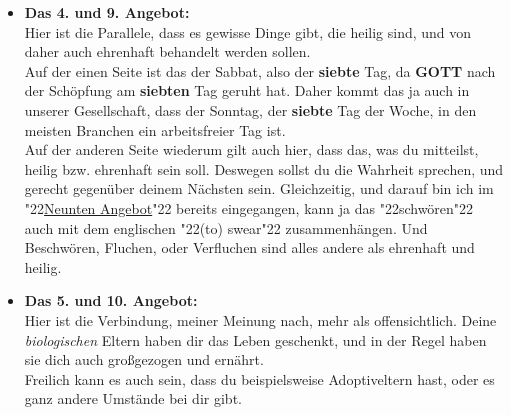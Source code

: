 \documentclass[12pt,a5paper]{article}
\newcommand{\Er}[0]{\textbf{ER}}
\newcommand{\Gottes}[0]{\textbf{GOTTES}}
\newcommand{\Gott}[0]{\textbf{GOTT}}
\newcommand{\Seiner}[0]{\textbf{SEINER}}
\newcommand{\q}[1]{\char"22{#1}\char"22 }
\begin{document}
\begin{itemize}
					dass man auf der einen Seite,
					im symbolischen Sinne,
					einen Teil von {\Gottes} Allmacht \q{stehlen} will.
					\\
					Ich dir ein Extrembeispiel zeigen:
					Angenommen,
					du springst aus dem Fenster,
					und sagst dir sowas wie:
					\q{Wenn es {\Gott} gibt, wird {\Er} mich auffangen.}.
					Damit w\"urdest du also einen Teil {\Seiner} Allmacht \q{stehlen} (wollen).
					\\
					Und auf der anderen Seite,
					gegen\"uber deinem Mitmenschen,
					ist es ja klar,
					dass gemeint ist,
					dass du deinem Mitmenschen nichts unberechtigt entwendest,
					also richtiger Diebstahl,
					oder auch Dienstleistungen unberechtigt in Anspruch nimmst:
					\q{Dienst\-leistungs-Dieb\-stahl},
					was man \"ublicherweise mit \q{Betrug} bezeichnet.
			\item	\textbf{Das 4. und 9. Angebot:}
					\\
					Hier ist die Parallele,
					dass es gewisse Dinge gibt,
					die heilig sind,
					und von daher auch ehrenhaft behandelt werden sollen.
					\\
					Auf der einen Seite ist das der Sabbat,
					also der \textbf{siebte} Tag,
					da {\Gott} nach der Sch\"opfung am \textbf{siebten} Tag geruht hat.
					Daher kommt das ja auch in unserer Gesellschaft,
					dass der Sonntag,
					der \textbf{siebte} Tag der Woche,
					in den meisten Branchen ein arbeitsfreier Tag ist.
					\\
					Auf der anderen Seite wiederum gilt auch hier,
					dass das,
					was du mitteilst,
					heilig bzw. ehrenhaft sein soll.
					Deswegen sollst du die Wahrheit sprechen,
					und gerecht gegen\"uber deinem N\"achsten sein.
					Gleichzeitig,
					und darauf bin ich im \q{\hyperref[DasNeunteAngebot]{Neunten Angebot}} bereits eingegangen,
					kann ja das \q{schw\"oren} auch mit dem englischen \q{(to) swear} zusammenh\"angen.
					Und Beschw\"oren,
					Fluchen,
					oder Verfluchen
					sind alles andere als ehrenhaft und heilig.
			\item	\textbf{Das 5. und 10. Angebot:}
					\\
					Hier ist die Verbindung,
					meiner Meinung nach,
					mehr als offensichtlich.
					Deine \textit{biologischen} Eltern haben dir das Leben geschenkt,
					und in der Regel haben sie dich auch gro{\ss}gezogen und ern\"ahrt.
					\\
					Freilich kann es auch sein,
					dass du beispielsweise Adoptiveltern hast,
					oder es ganz andere Umst\"ande bei dir gibt.

\end{itemize}
\end{document}
